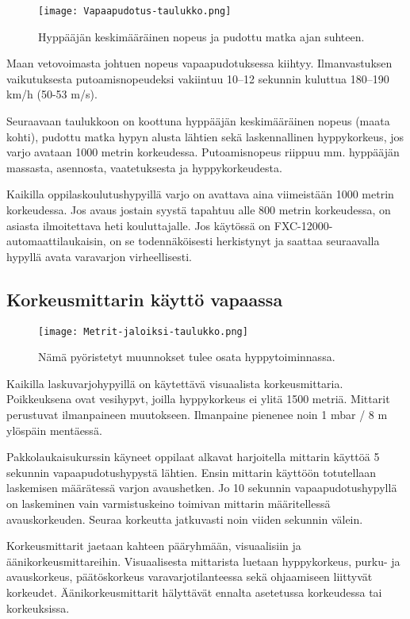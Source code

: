 \begin{figure*}[]\centering\texttt{[image: Vapaapudotus-taulukko.png]}\caption{Hyppääjän keskimääräinen nopeus ja pudottu matka ajan suhteen.}\end{figure*} 


Maan vetovoimasta johtuen nopeus vapaapudotuksessa kiihtyy. Ilmanvastuksen vaikutuksesta putoamisnopeudeksi vakiintuu 10–12 sekunnin kuluttua 180–190 km/h (50-53 m/s). 


Seuraavaan taulukkoon on koottuna hyppääjän keskimääräinen nopeus (maata kohti), pudottu matka hypyn alusta lähtien sekä laskennallinen hyppykorkeus, jos varjo avataan 1000 metrin korkeudessa. Putoamisnopeus riippuu mm. hyppääjän massasta, asennosta, vaatetuksesta ja hyppykorkeudesta. 


Kaikilla oppilaskoulutushypyillä varjo on avattava aina viimeistään 1000 metrin korkeudessa. Jos avaus jostain syystä tapahtuu alle 800 metrin korkeudessa, on asiasta ilmoitettava heti kouluttajalle. Jos käytössä on FXC-12000-automaattilaukaisin, on se todennäköisesti herkistynyt ja saattaa seuraavalla hypyllä avata varavarjon virheellisesti. 

\subsection{ Korkeusmittarin käyttö vapaassa }
\label{hyppytapahtuma-korkeusmittarin-kaytto-vapaassa}


\begin{figure*}[]\centering\texttt{[image: Metrit-jaloiksi-taulukko.png]}\caption{Nämä pyöristetyt muunnokset tulee osata hyppytoiminnassa.}\end{figure*} 


Kaikilla laskuvarjohypyillä on käytettävä visuaalista korkeusmittaria. Poikkeuksena ovat vesihypyt, joilla hyppykorkeus ei ylitä 1500 metriä. Mittarit perustuvat ilmanpaineen muutokseen. Ilmanpaine pienenee noin 1 mbar / 8 m ylöspäin mentäessä.  


Pakkolaukaisukurssin käyneet oppilaat alkavat harjoitella mittarin käyttöä 5 sekunnin vapaapudotushypystä lähtien. Ensin mittarin käyttöön totutellaan laskemisen määrätessä varjon avaushetken. Jo 10 sekunnin vapaapudotushypyllä on laskeminen vain varmistuskeino toimivan mittarin määritellessä avauskorkeuden. Seuraa korkeutta jatkuvasti noin viiden sekunnin välein. 


Korkeusmittarit jaetaan kahteen pääryhmään, visuaalisiin ja äänikorkeusmittareihin. Visuaalisesta mittarista luetaan hyppykorkeus, purku- ja avauskorkeus, päätöskorkeus varavarjotilanteessa sekä ohjaamiseen liittyvät korkeudet. Äänikorkeusmittarit hälyttävät ennalta asetetussa korkeudessa tai korkeuksissa.  


